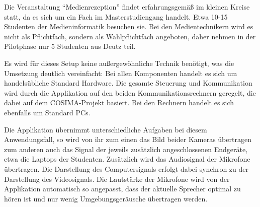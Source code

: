   Die Veranstaltung "`Medienrezeption"' findet erfahrungsgemäß im kleinen Kreise statt, da es sich um ein Fach im Masterstudiengang handelt. Etwa 10-15 Studenten der Medieninformatik besuchen sie. Bei den Medientechnikern wird es nicht als Pflichtfach, sondern als Wahlpflichtfach angeboten, daher nehmen in der Pilotphase nur 5 Studenten aus Deutz teil.

  Es wird für dieses Setup keine außergewöhnliche Technik benötigt, was die Umsetzung deutlich vereinfacht: Bei allen Komponenten handelt es sich um handelsübliche Standard Hardware. Die gesamte Steuerung und Kommunikation wird durch die Applikation auf den beiden Kommunikationsrechnern geregelt, die dabei auf dem COSIMA-Projekt basiert. Bei den Rechnern handelt es sich ebenfalls um Standard PCs.

  Die Applikation übernimmt unterschiedliche Aufgaben bei diesem Anwendungsfall, so wird von ihr zum einen das Bild beider Kameras übertragen zum anderen auch das Signal der jeweils zusätzlich angeschlossenen Endgeräte, etwa die Laptops der Studenten. Zusätzlich wird das Audiosignal der Mikrofone übertragen. Die Darstellung des Computersignals erfolgt dabei synchron zu der Darstellung des Videosignals. Die Lautstärke der Mikrofone wird von der Applikation automatisch so angepasst, dass der aktuelle Sprecher optimal zu hören ist und nur wenig Umgebungsgeräusche übertragen werden.



% 
% 

